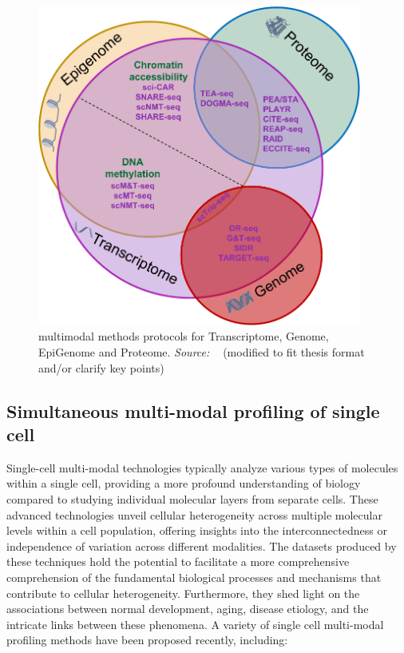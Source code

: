 \begin{figure}[!ht]
	\centering
	\includegraphics[width=0.95\textwidth]{multi-model-methods/fig}
	\vspace{0.1cm}
	\caption[multimodal methods protocols for Transcriptome, Genome, EpiGenome and Proteome]{multimodal methods protocols for Transcriptome, Genome, EpiGenome and Proteome. \emph{Source: ~\cite{lee2020single}} (modified to fit thesis format and/or clarify key points)}
	\label{fig:piechart-mulitmodal-methods}
\end{figure}



\subsection{Simultaneous multi-modal profiling of single cell}
\label{background:sec1:mulitmodal}
Single-cell multi-modal technologies typically analyze various types of molecules within a single cell, providing a more profound understanding of biology compared to studying individual molecular layers from separate cells. These advanced technologies unveil cellular heterogeneity across multiple molecular levels within a cell population, offering insights into the interconnectedness or independence of variation across different modalities. The datasets produced by these techniques hold the potential to facilitate a more comprehensive comprehension of the fundamental biological processes and mechanisms that contribute to cellular heterogeneity. Furthermore, they shed light on the associations between normal development, aging, disease etiology, and the intricate links between these phenomena. A variety of single cell multi-modal profiling methods have been proposed recently, including:

